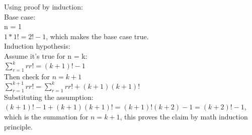 \documentclass{article}
\begin{document}
Using proof by induction:\\
Base case:\\
n = 1\\
$1*1! = 2! - 1$, which makes the base case true.\\
Induction hypothesis:\\
Assume it's true for n = k:\\
$\sum_{r=1}^krr! = (k+1)! - 1$\\
Then check for $n = k + 1$\\
$\sum_{r=1}^{k+1}rr! = \sum_{r=1}^krr! + (k+1)(k+1)!$\\
Substituting the assumption:\\
$(k+1)! - 1 + (k+1)(k+1)! = (k+1)!(k + 2) - 1 = (k+2)! - 1$, which is the summation for $n = k + 1$, this proves the claim by math induction principle.
\end{document}
